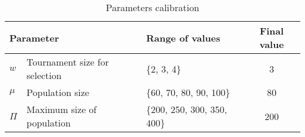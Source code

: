 \begin{table}[H]
\centering
\begin{tabular}{@{}lllc@{}}
\toprule
\multicolumn{2}{l}{Parameter}           & Range of values             & Final value \\ \midrule
$w$     & Tournament size for selection & \{2, 3, 4\}                 & 3           \\
$\mu$   & Population size               & \{60, 70, 80, 90, 100\}     & 80          \\
$\Pi$   & Maximum size of population    & \{200, 250, 300, 350, 400\} & 200         \\ \bottomrule
\end{tabular}
\caption{Parameters calibration}
\label{calibration}
\end{table}